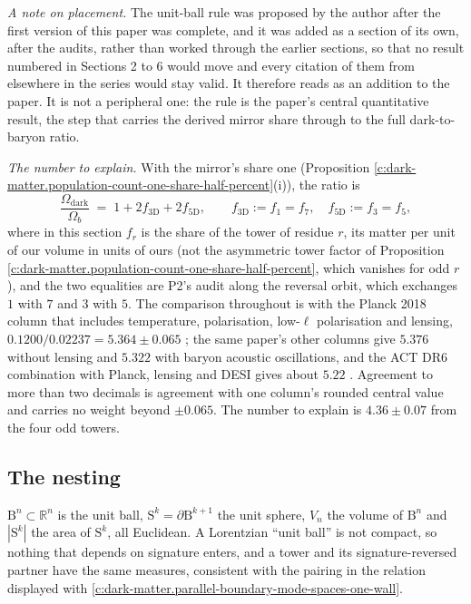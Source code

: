 \documentclass[11pt]{article}
\theoremstyle{definition}
\theoremstyle{plain}
\providecommand{\B}{}\renewcommand{\B}{\mathrm{B}}
\providecommand{\R}{}\renewcommand{\R}{\mathbb{R}}
\providecommand{\Sph}{}\renewcommand{\Sph}{\mathrm{S}}
\begin{document}
\emph{A note on placement.} The unit-ball rule was proposed by the author after the first version of this paper was complete, and it was added as a section of its own, after the audits, rather than worked through the earlier sections, so that no result numbered in Sections 2 to 6 would move and every citation of them from elsewhere in the series would stay valid. It therefore reads as an addition to the paper. It is not a peripheral one: the rule is the paper's central quantitative result, the step that carries the derived mirror share through to the full dark-to-baryon ratio.

\emph{The number to explain.} With the mirror's share one (Proposition \ref{c:dark-matter.population-count-one-share-half-percent}(i)), the ratio is
\begin{equation}
\frac{\Omega_{\mathrm{dark}}}{\Omega_{b}} \;=\; 1 + 2 f_{3\mathrm{D}} + 2 f_{5\mathrm{D}}, \qquad f_{3\mathrm{D}} := f_{1} = f_{7}, \quad f_{5\mathrm{D}} := f_{3} = f_{5},
\end{equation}
where in this section $f_{r}$ is the share of the tower of residue $r$, its matter per unit of our volume in units of ours (not the asymmetric tower factor of Proposition \ref{c:dark-matter.population-count-one-share-half-percent}, which vanishes for odd $r$), and the two equalities are P2's audit along the reversal orbit, which exchanges $1$ with $7$ and $3$ with $5$. The comparison throughout is with the Planck 2018 column that includes temperature, polarisation, low-$\ell$ polarisation and lensing, $0.1200/0.02237 = 5.364 \pm 0.065$ \cite{Planck2018}; the same paper's other columns give $5.376$ without lensing and $5.322$ with baryon acoustic oscillations, and the ACT DR6 combination with Planck, lensing and DESI gives about $5.22$ \cite{ACTDR6}. Agreement to more than two decimals is agreement with one column's rounded central value and carries no weight beyond $\pm 0.065$. The number to explain is $4.36 \pm 0.07$ from the four odd towers.

\subsection*{The nesting}
\label{c:note.dark-matter.setting-nesting}
$\B^{n} \subset \R^{n}$ is the unit ball, $\Sph^{k} = \partial\B^{k+1}$ the unit sphere, $V_{n}$ the volume of $\B^{n}$ and $|\Sph^{k}|$ the area of $\Sph^{k}$, all Euclidean. A Lorentzian ``unit ball'' is not compact, so nothing that depends on signature enters, and a tower and its signature-reversed partner have the same measures, consistent with the pairing in the relation displayed with \ref{c:dark-matter.parallel-boundary-mode-spaces-one-wall}.
\end{document}
